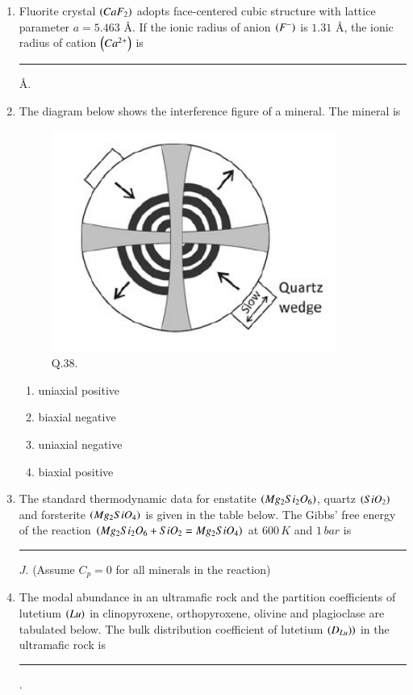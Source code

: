 \documentclass[journal,12pt,onecolumn]{IEEEtran}
\theoremstyle{remark}
\begin{document}
\begin{enumerate}
    \item Fluorite crystal $\left(CaF_2\right)$ adopts face-centered cubic structure with lattice parameter $a=5.463$ \AA. If the ionic radius of anion $\left(F^{-}\right)$ is $1.31$ \AA, the ionic radius of cation $\left(Ca^{2+}\right)$ is \rule{3cm}{0.15mm} \AA. \hfill{}
    
    \item The diagram below shows the interference figure of a mineral. The mineral is \hfill{}
        \begin{figure}[h]
            \centering
            \includegraphics[width=0.5\columnwidth]{Figs/fig_6.png}
            \caption{Q.38.}
            \label{fig:placeholder_6}
        \end{figure}
        \begin{enumerate} 
            \item uniaxial positive
            \item biaxial negative
            \item uniaxial negative
            \item biaxial positive
        \end{enumerate}
    
    \item The standard thermodynamic data for enstatite $\left(Mg_2Si_2O_6\right)$, quartz $\left(SiO_2\right)$ and forsterite $\left(Mg_2SiO_4\right)$ is given in the table below. The Gibbs' free energy of the reaction $\left(Mg_2Si_2O_6 + SiO_2 = Mg_2SiO_4\right)$ at $600\,K$ and $1\,bar$ is \rule{3cm}{0.15mm} $J$. (Assume $C_p=0$ for all minerals in the reaction) \hfill{}
        \begin{table}[H]
            \centering
               
        \end{table}
    
    \item The modal abundance in an ultramafic rock and the partition coefficients of lutetium $\left(Lu\right)$ in clinopyroxene, orthopyroxene, olivine and plagioclase are tabulated below. The bulk distribution coefficient of lutetium $\left(D_{Lu})\right)$ in the ultramafic rock is \rule{3cm}{0.15mm}. \hfill{}
        \begin{table}[H]
            \centering
            
        \end{table}
    

\end{enumerate}
\end{document}

